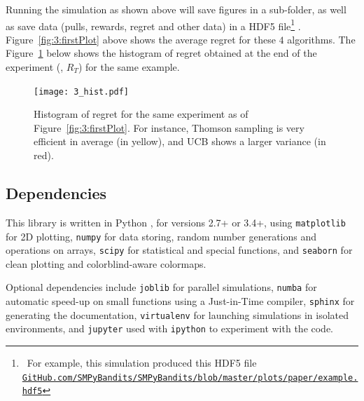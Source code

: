Running the simulation as shown above will save figures in a sub-folder, as well as save data (pulls, rewards, regret and other data) in a HDF5 file\footnote{~For example, this simulation produced this HDF5 file\\\texttt{\href{https://github.com/SMPyBandits/SMPyBandits/blob/master/plots/paper/example.hdf5}{GitHub.com/SMPyBandits/SMPyBandits/blob/master/plots/paper/example.hdf5}}}
\cite{h5py}.
Figure~\ref{fig:3:firstPlot} above shows the average regret for these $4$ algorithms.
The Figure~\ref{fig:3:firstPlot_hist} below shows the histogram of regret obtained at the end of the experiment (\ie, $R_T$) for the same example.

\begin{figure}[h!]  %
	\centering
	\texttt{[image: 3\_hist.pdf]}
	\caption{Histogram of regret for the same experiment as of Figure~\ref{fig:3:firstPlot}. For instance, Thomson sampling is very efficient in average (in yellow), and UCB shows a larger variance (in red).}
	\label{fig:3:firstPlot_hist}
\end{figure}


\subsection{Dependencies}
\label{sub:3:dependencies}

This library is written in Python \cite{python}, for versions 2.7+ or 3.4+, using \texttt{matplotlib} \cite{matplotlib} for 2D plotting, \texttt{numpy} \cite{numpy} for data storing, random number generations and operations on arrays, \texttt{scipy} \cite{scipy} for statistical and special functions, and \texttt{seaborn} \cite{seaborn} for clean plotting and colorblind-aware colormaps.

Optional dependencies include \texttt{joblib} \cite{joblib} for parallel simulations, \texttt{numba} \cite{numba} for automatic speed-up on small functions using a Just-in-Time compiler, \texttt{sphinx} \cite{sphinx} for generating the documentation, \texttt{virtualenv} \cite{virtualenv} for launching simulations in isolated environments, and \texttt{jupyter} \cite{jupyter} used with \texttt{ipython} \cite{ipython} to experiment with the code.

